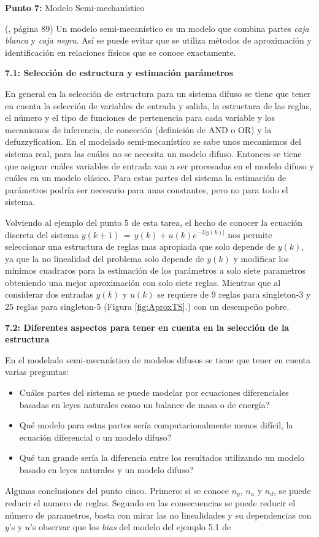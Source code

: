 \documentclass[10pt,onecolumn,twoside,letterpaper]{article}
\begin{document}
\par{\bf \large Punto 7:} Modelo Semi-mechan\'istico\\
\par(\cite{Babuska1999}, página 89) Un modelo semi-mecanístico es un modelo que combina partes \emph{caja blanca} y \emph{caja negra}. Así se puede evitar que se utiliza métodos de aproximación y identificación en relaciones físicos que se conoce exactamente.
\par{\bf 7.1: Selecci\'on de estructura y estimaci\'on par\'ametros}\\
\par En general en la selección de estructura para un sistema difuso se tiene que tener en cuenta la selección de variables de entrada y salida, la estructura de las reglas, el número y el tipo de funciones de pertenencia para cada variable y los mecanismos de inferencia, de conección (definición de AND o OR) y la defuzzyfication. En el modelado semi-mecanístico se sabe unos mecanismos del sistema real, para las cuáles no se necesita un modelo difuso. Entonces se tiene que asignar cuáles variables de entrada van a ser procesadas en el modelo difuso y cuáles en un modelo clásico. Para estas partes del sistema la estimación de parámetros podría ser necesario para unas constantes, pero no para todo el sistema.
\par Volviendo al ejemplo del punto 5 de esta tarea, el hecho de conocer la ecuaci\'on discreta del sistema $y(k+1)\,=\,y(k)+u(k)e^{-3\left|y(k)\right|}$ nos permite seleccionar una estructura de reglas mas apropiada que solo depende de $y(k)$, ya que la no linealidad del problema solo depende de $y(k)$ y modificar los minimos cuadraros para la estimaci\'on de los par\'ametros a solo siete parametros obteniendo una mejor aproximaci\'on con solo siete reglas. Mientras que al considerar dos entradas $y(k)$ y $u(k)$ se requiere de 9 reglas para singleton-3 y 25 reglas para singleton-5 (Figura \ref{fig:AproxTS}.) con un desempeño pobre.
\par{\bf 7.2: Diferentes aspectos para tener en cuenta en la selecci\'on de la estructura}\\
\par En el modelado semi-mecanístico de modelos difusos se tiene que tener en cuenta varias preguntas:
\begin{itemize}
\item Cuáles partes del sistema se puede modelar por ecuaciones diferenciales basadas en leyes naturales como un balance de masa o de energía?
\item Qué modelo para estas partes sería computacionalmente menos difícil, la ecuación diferencial o un modelo difuso?
\item Qué tan grande sería la diferencia entre los resultados utilizando un modelo basado en leyes naturales y un modelo difuso?
\end{itemize}
\par Algunas conclusiones del punto cinco. Primero: si se conoce $n_y$, $n_u$ y $n_d$, se puede reducir el numero de reglas. Segundo en las consecuencias se puede reducir el n\'umero de parametros, basta con mirar las no linealidades y su dependencias con $y$'s y $u$'s observar que los \emph{bias} del modelo del ejemplo 5.1 de \cite{Babuska1999}
\end{document}

